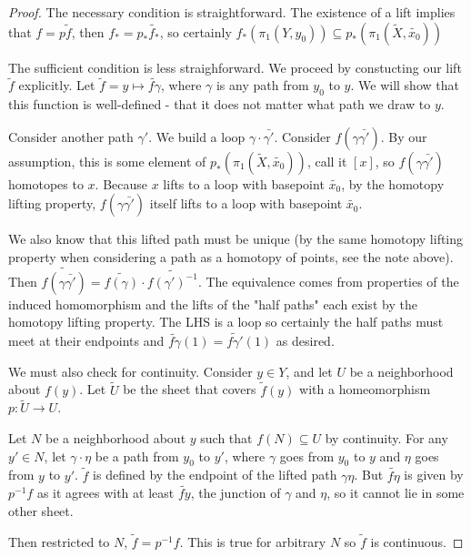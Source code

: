\documentclass[10pt]{article}
\begin{document}
\begin{proof}
	The necessary condition is straightforward. The existence of a lift implies
	that $f = p\tilde{f}$, then $f_* = p_*\tilde{f_*}$, so certainly
	$f_*(\pi_1(Y, y_0)) \subseteq p_*(\pi_1(\tilde{X}, \tilde{x_0}))$

	The sufficient condition is less straighforward. We proceed by constucting
	our lift $\tilde{f}$ explicitly. Let $\tilde{f} = y \mapsto \tilde{f\gamma}$,
	where $\gamma$ is any path from $y_0$ to $y$. We will show that this function
	is well-defined - that it does not matter what path we draw to $y$. 

	Consider another path $\gamma'$. We build a loop $\gamma \cdot \bar{\gamma'}$.
	Consider $f(\gamma \bar{\gamma'})$. By our assumption, this is some element
	of $p_*(\pi_1(\tilde{X}, \tilde{x_0}))$, call it $[ x ]$, so $f(\gamma
	\bar{\gamma'})$ homotopes to $x$. Because $x$ lifts to a loop with basepoint $\tilde{x_0}$, by the homotopy
	lifting property, $f(\gamma \bar{\gamma'})$ itself lifts to a loop with
	basepoint $\tilde{x_0}$. 

	We also know that this lifted path must be unique (by the same homotopy
	lifting property when considering a path as a homotopy of points, see the
	note above). Then $\tilde{f(\gamma \bar{\gamma'})} = \tilde{f(\gamma)} \cdot
	\tilde{f(\gamma')^{-1}}$. The equivalence comes from properties of the
	induced homomorphism and the lifts of the "half paths" each exist by the homotopy
	lifting property. The LHS is a loop so certainly the half paths must meet at
	their endpoints and $\tilde{f\gamma}(1) = \tilde{f\gamma'}(1)$ as desired.

	We must also check for continuity. Consider $y \in Y$, and let $U$ be a
	neighborhood about $f(y)$. Let $\tilde{U}$ be the sheet that covers
	$\tilde{f}(y)$ with a homeomorphism $p: \tilde{U} \to U$. 

	Let $N$ be a neighborhood about $y$ such that $f(N) \subseteq U$ by
	continuity. For any $y' \in N$, let $\gamma \cdot \eta$ be a path from $y_0$
	to $y'$, where $\gamma$ goes from $y_0$ to $y$ and $\eta$ goes from $y$ to
	$y'$. $\tilde{f}$ is defined by the endpoint of the lifted path $\gamma
	\eta$. But $\tilde{f \eta}$ is given by $p^{-1}f$ as it agrees with at least
	$\tilde{f y}$, the junction of $\gamma$ and $\eta$, so it cannot lie in some other sheet.

	Then restricted to $N$, $\tilde{f} = p^{-1}f$. This is true for
	arbitrary $N$ so $\tilde{f}$ is continuous.
\end{proof}
\end{document}
